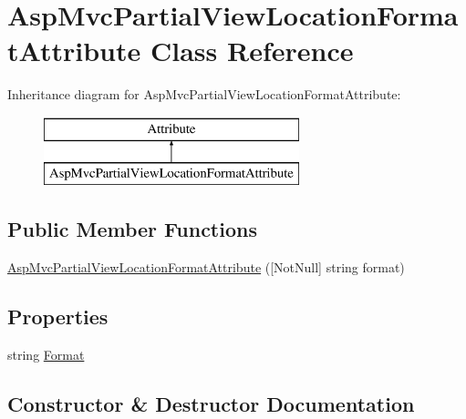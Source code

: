 \hypertarget{class_asp_mvc_partial_view_location_format_attribute}{}\section{Asp\+Mvc\+Partial\+View\+Location\+Format\+Attribute Class Reference}
\label{class_asp_mvc_partial_view_location_format_attribute}
Inheritance diagram for Asp\+Mvc\+Partial\+View\+Location\+Format\+Attribute\+:\begin{figure}[H]
\begin{center}
\leavevmode
\includegraphics[height=2.000000cm]{class_asp_mvc_partial_view_location_format_attribute}
\end{center}
\end{figure}
\subsection*{Public Member Functions}
\begin{DoxyCompactItemize}
\item 
\mbox{\hyperlink{class_asp_mvc_partial_view_location_format_attribute_a9bd231add4346a15b8e6b2eea8a97eaa}{Asp\+Mvc\+Partial\+View\+Location\+Format\+Attribute}} (\mbox{[}Not\+Null\mbox{]} string format)
\end{DoxyCompactItemize}
\subsection*{Properties}
\begin{DoxyCompactItemize}
\item 
string \mbox{\hyperlink{class_asp_mvc_partial_view_location_format_attribute_ab75cab80e0a441e206eadb7adce25efd}{Format}}
\end{DoxyCompactItemize}


\subsection{Constructor \& Destructor Documentation}
\mbox{\label{class_asp_mvc_partial_view_location_format_attribute_a9bd231add4346a15b8e6b2eea8a97eaa}} 
